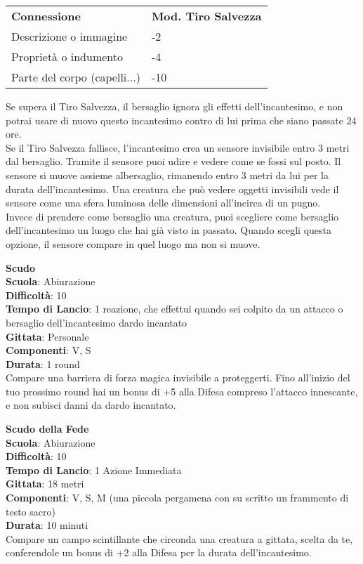 \begin{multicols}{2}
\medskip

\begin{tabular}{ll}
	\toprule
\textbf{Connessione} & \textbf{Mod. Tiro Salvezza}\\
Descrizione o immagine &-2\\
Proprietà o indumento & -4\\
Parte del corpo (capelli...)&-10\\
\end{tabular}

Se supera il Tiro Salvezza, il bersaglio ignora gli effetti dell'incantesimo, e non potrai usare di nuovo questo incantesimo contro di lui prima che siano passate 24 ore.\\
Se il Tiro Salvezza fallisce, l'incantesimo crea un sensore invisibile entro 3 metri dal bersaglio. Tramite il sensore puoi udire e vedere come se fossi sul posto. Il sensore si muove assieme albersaglio, rimanendo entro 3 metri da lui per la durata dell'incantesimo. Una creatura che può  vedere oggetti invisibili vede il sensore come una sfera luminosa delle dimensioni  all'incirca di un pugno.\\
Invece di prendere come bersaglio una creatura, puoi scegliere come bersaglio dell'incantesimo un luogo che hai già visto in passato. Quando scegli questa opzione, il sensore compare in quel luogo ma non si muove. 

\medskip\textbf{Scudo}\\
\textbf{Scuola}: Abiurazione\\
\textbf{Difficoltà}:  10\\
\textbf{Tempo di Lancio}: 1 reazione, che effettui quando sei colpito da un attacco o bersaglio dell'incantesimo dardo incantato\\
\textbf{Gittata}: Personale\\
\textbf{Componenti}: V, S\\
\textbf{Durata}: 1 round\\
Compare una barriera di forza magica invisibile a proteggerti. Fino all'inizio del tuo prossimo round hai un bonus di +5 alla Difesa compreso l’attacco innescante, e non subisci danni da dardo incantato.

\medskip\textbf{Scudo della Fede}\\
\textbf{Scuola}: Abiurazione\\
\textbf{Difficoltà}:  10\\
\textbf{Tempo di Lancio}: 1 Azione Immediata\\
\textbf{Gittata}: 18 metri\\
\textbf{Componenti}: V, S, M (una piccola pergamena con su scritto un frammento di testo sacro)\\
\textbf{Durata}: 10 minuti\\
Compare un campo scintillante che circonda una creatura a gittata, scelta da te, conferendole un bonus di +2 alla Difesa per la durata dell'incantesimo.


\end{multicols}
